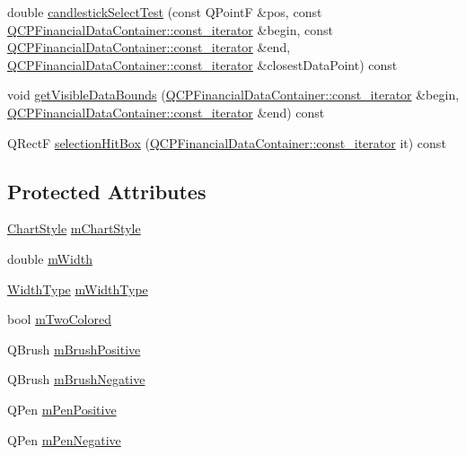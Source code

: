 \begin{DoxyCompactItemize}
\item 
double \hyperlink{class_q_c_p_financial_a9783e91a33fd08a402b1a3821d43e471}{candlestick\+Select\+Test} (const Q\+PointF \&pos, const \hyperlink{class_q_c_p_data_container_ae40a91f5cb0bcac61d727427449b7d15}{Q\+C\+P\+Financial\+Data\+Container\+::const\+\_\+iterator} \&begin, const \hyperlink{class_q_c_p_data_container_ae40a91f5cb0bcac61d727427449b7d15}{Q\+C\+P\+Financial\+Data\+Container\+::const\+\_\+iterator} \&end, \hyperlink{class_q_c_p_data_container_ae40a91f5cb0bcac61d727427449b7d15}{Q\+C\+P\+Financial\+Data\+Container\+::const\+\_\+iterator} \&closest\+Data\+Point) const
\item 
void \hyperlink{class_q_c_p_financial_a31a3dda8b6b9a5b674e28f1daeb21a75}{get\+Visible\+Data\+Bounds} (\hyperlink{class_q_c_p_data_container_ae40a91f5cb0bcac61d727427449b7d15}{Q\+C\+P\+Financial\+Data\+Container\+::const\+\_\+iterator} \&begin, \hyperlink{class_q_c_p_data_container_ae40a91f5cb0bcac61d727427449b7d15}{Q\+C\+P\+Financial\+Data\+Container\+::const\+\_\+iterator} \&end) const
\item 
Q\+RectF \hyperlink{class_q_c_p_financial_afbe9e8cb0de3e9e789a9668b29cad098}{selection\+Hit\+Box} (\hyperlink{class_q_c_p_data_container_ae40a91f5cb0bcac61d727427449b7d15}{Q\+C\+P\+Financial\+Data\+Container\+::const\+\_\+iterator} it) const
\end{DoxyCompactItemize}
\subsection*{Protected Attributes}
\begin{DoxyCompactItemize}
\item 
\hyperlink{class_q_c_p_financial_a0f800e21ee98d646dfc6f8f89d10ebfb}{Chart\+Style} \hyperlink{class_q_c_p_financial_ab65c2ce8d6354451870bb44b894c1e92}{m\+Chart\+Style}
\item 
double \hyperlink{class_q_c_p_financial_af630e5eb8485146b9c777e63fd1cf993}{m\+Width}
\item 
\hyperlink{class_q_c_p_financial_aef1761dda71a53dc5269685e9e492626}{Width\+Type} \hyperlink{class_q_c_p_financial_a7926204997e04c9de9dbe1f092df125a}{m\+Width\+Type}
\item 
bool \hyperlink{class_q_c_p_financial_a6afe919190b884d9bac026cefcc8c0a8}{m\+Two\+Colored}
\item 
Q\+Brush \hyperlink{class_q_c_p_financial_ab7e6eed16260a2f88ca6bd940dffea79}{m\+Brush\+Positive}
\item 
Q\+Brush \hyperlink{class_q_c_p_financial_acb0e31874b7a1deb56bd42e8ab3e68f2}{m\+Brush\+Negative}
\item 
Q\+Pen \hyperlink{class_q_c_p_financial_aa6599186f417ba615caebb3f6c762bd8}{m\+Pen\+Positive}
\item 
Q\+Pen \hyperlink{class_q_c_p_financial_a263fbfefde2cc19c8d4024a8319c2bbb}{m\+Pen\+Negative}
\end{DoxyCompactItemize}
